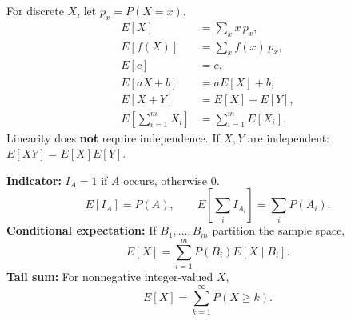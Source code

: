 \documentclass[portrait, 8pt, a4paper, oneside, twocolumn]{extarticle}
\begin{document}
For discrete $X$, let $p_x=P(X=x)$.
\begin{align*}
E[X] &= \sum_x x\,p_x,\\
E[f(X)] &= \sum_x f(x)\,p_x,\\
E[c] &= c,\\
E[aX+b] &= aE[X]+b,\\
E[X+Y] &= E[X]+E[Y],\\
E\left[\sum_{i=1}^{m}X_i\right] &= \sum_{i=1}^{m}E[X_i].
\end{align*}
Linearity does \textbf{not} require independence.
If $X,Y$ are independent: $E[XY]=E[X]E[Y]$.

\textbf{Indicator:} $I_A=1$ if $A$ occurs, otherwise $0$.
\[
E[I_A]=P(A),\qquad E\left[\sum_i I_{A_i}\right]=\sum_i P(A_i).
\]
\textbf{Conditional expectation:} If $B_1,\ldots,B_m$ partition the sample space,
\[
E[X]=\sum_{i=1}^{m}P(B_i)E[X\mid B_i].
\]
\textbf{Tail sum:} For nonnegative integer-valued $X$,
\[
E[X]=\sum_{k=1}^{\infty}P(X\ge k).
\]
\end{document}
